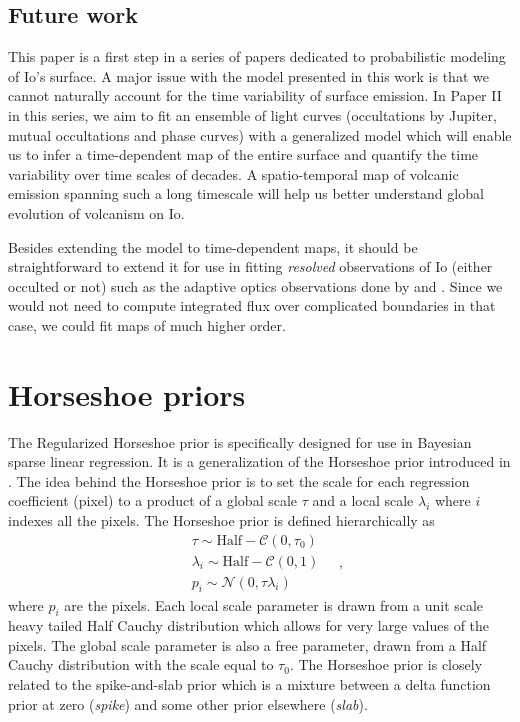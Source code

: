 \documentclass[modern]{aastex62}
\begin{document}
\subsection{Future work}
This paper is a first step in a series of papers dedicated to probabilistic modeling of Io's surface. 
A major issue with the model presented in this work is that we cannot naturally account for the time variability of surface emission.
In Paper II in this series, we aim to fit an ensemble of light curves (occultations by Jupiter, mutual occultations and phase curves) with a generalized model which will enable us to infer a time-dependent map of the entire surface and quantify the time variability over time scales of decades.
A spatio-temporal map of volcanic emission spanning such a long timescale will help us better understand global evolution of volcanism on Io. 

Besides extending the model to time-dependent maps, it should be straightforward to extend it for use in fitting \emph{resolved} observations of Io (either occulted or not) such as the adaptive optics observations done by \cite{dekleer2016a} and \cite{dekleer2016}.
Since we would not need to compute integrated flux over complicated boundaries in that case, we could fit maps of much higher order.




\appendix
\section{Horseshoe priors}
\label{app:horseshoe}
The Regularized Horseshoe prior \citep{piironen2017} is specifically designed for use in Bayesian sparse linear regression. 
It is a generalization of the Horseshoe prior introduced in \cite{carvalho2010a}.
The idea behind the Horseshoe prior is to set the scale for each regression coefficient (pixel) to a product of a global scale $\tau$ and a local scale $\lambda_i$ where $i$ indexes all the pixels.
The Horseshoe prior is defined hierarchically as 
\begin{equation}
\begin{aligned}
    &\tau  \sim \mathrm{Half}-\mathcal{C} \left(0, \tau_{0}\right)\\
    &\lambda_{i}  \sim \mathrm{Half}-\mathcal{C} (0,1) \\
    &p_{i}  \sim \mathcal{N}\left(0, \tau \lambda_{i}\right) 
\end{aligned}
    \quad,
    \label{eq:horseshoe}
\end{equation}
where $p_i$ are the pixels.
Each local scale parameter is drawn from a unit scale heavy tailed Half Cauchy distribution which allows for very large values of the pixels.
The global scale parameter is also a free parameter, drawn from a Half Cauchy distribution with the scale equal to $\tau_0$.
The Horseshoe prior is closely related to the spike-and-slab prior which is a mixture between a delta function prior at zero (\emph{spike}) and some other prior elsewhere (\emph{slab}).
\end{document}

